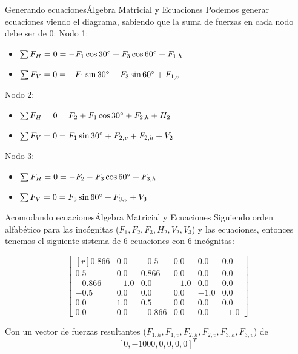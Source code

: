 \documentclass[spanish, c]{beamer}
\begin{document}
\begin{frame}{Generando ecuaciones}{Álgebra Matricial y Ecuaciones}
    Podemos generar ecuaciones viendo el diagrama, sabiendo que la suma de fuerzas en cada nodo debe ser de 0:
    \bigskip
    Nodo 1:
    \begin{itemize}
        \item $\sum F_H = 0 = -F_1 \cos 30\degree + F_3 \cos 60\degree + F_{1,h}$
        \item $\sum F_V = 0 = -F_1 \sin 30\degree - F_3 \sin 60\degree + F_{1,v}$
    \end{itemize}
    Nodo 2:
    \begin{itemize}
        \item $\sum F_H = 0 = F_2 + F_1 \cos 30\degree + F_{2, h} + H_2$
        \item $\sum F_V = 0 = F_1 \sin 30\degree + F_{2,v} + F_{2, h} + V_2$
    \end{itemize}
    Nodo 3:
    \begin{itemize}
        \item $\sum F_H = 0 = -F_2 -F_3 \cos 60\degree + F_{3,h}$
        \item $\sum F_V = 0 = F_3 \sin 60\degree + F_{3,v} + V_3$
    \end{itemize}
\end{frame}

\begin{frame}{Acomodando ecuaciones}{Álgebra Matricial y Ecuaciones}
    Siguiendo orden alfabético para las incógnitas ($F_1, F_2, F_3, H_2, V_2, V_3$) y las ecuaciones, entonces tenemos el siguiente sistema de 6 ecuaciones con 6 incógnitas:
    
    $$\begin{bmatrix*}[r]%
        0.866 & 0.0 & -0.5 & 0.0 & 0.0 & 0.0 \\
        0.5 & 0.0 & 0.866 & 0.0 & 0.0 & 0.0 \\
    -0.866 & -1.0 & 0.0 & -1.0 & 0.0 & 0.0 \\
    -0.5 & 0.0 & 0.0 & 0.0 & -1.0 & 0.0 \\
    0.0 & 1.0 & 0.5 & 0.0 & 0.0 & 0.0 \\
    0.0 & 0.0 & -0.866 & 0.0 & 0.0 & -1.0\end{bmatrix*}$$

    \bigskip
    Con un vector de fuerzas resultantes ($F_{1,h}, F_{1,v}, F_{2,h}, F_{2,v}, F_{3,h}, F_{3,v}$) de $$[0, -1000, 0, 0, 0, 0]^T$$
\end{frame}
\end{document}
